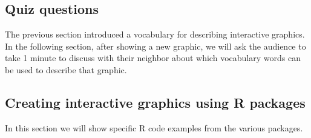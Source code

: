 \documentclass[11pt]{article}
\begin{document}
\subsection{Quiz questions}
\label{sec:orgheadline8}

The previous section introduced a vocabulary for describing
interactive graphics. In the following section, after showing a new
graphic, we will ask the audience to take 1 minute to discuss with
their neighbor about which vocabulary words can be used to describe
that graphic.

\subsection{Creating interactive graphics using R packages}
\label{sec:orgheadline9}

In this section we will show specific R code examples from the various
packages.
\end{document}
